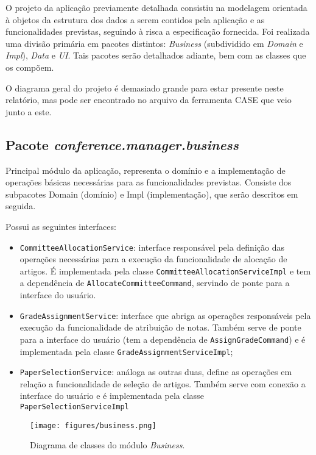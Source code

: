 \documentclass[a4paper, 12pt]{article}
\begin{document}
O projeto da aplicação previamente detalhada consistiu na modelagem orientada à objetos da estrutura dos dados a serem contidos pela aplicação e as funcionalidades previstas, seguindo à risca a especificação fornecida. Foi realizada uma divisão primária em pacotes distintos: \emph{Business} (subdividido em \emph{Domain} e \emph{Impl}), \emph{Data} e \emph{UI}. Tais pacotes serão detalhados adiante, bem com as classes que os compõem. 

O diagrama geral do projeto é demasiado grande para estar presente neste relatório, mas pode ser encontrado no arquivo da ferramenta CASE que veio junto a este.

\subsection{Pacote \emph{conference.manager.business}}

Principal módulo da aplicação, representa o domínio e a implementação de operações básicas necessárias para as funcionalidades previstas. Consiste dos subpacotes Domain (domínio) e Impl (implementação), que serão descritos em seguida.

Possui as seguintes interfaces:
\begin{itemize}
\item \verb|CommitteeAllocationService|: interface responsável pela definição das operações necessárias para a execução da funcionalidade de alocação de artigos. É implementada pela classe \verb|CommitteeAllocationServiceImpl| e tem a dependência de \verb|AllocateCommitteeCommand|, servindo de ponte para a interface do usuário.
\item \verb|GradeAssignmentService|: interface que abriga as operações responsáveis pela execução da funcionalidade de atribuição de notas. Também serve de ponte para a interface do usuário (tem a dependência de \verb|AssignGradeCommand|)  e é implementada pela classe \verb|GradeAssignmentServiceImpl|;
\item \verb|PaperSelectionService|: análoga as outras duas, define as operações em relação a funcionalidade de seleção de artigos. Também serve com conexão a interface do usuário e é implementada pela classe \verb|PaperSelectionServiceImpl|
\end{itemize}

\begin{figure}[h]
\centering
\texttt{[image: figures/business.png]}
\caption{Diagrama de classes do módulo \emph{Business}.}
\label{fig:business}
\end{figure}
\FloatBarrier
\end{document}
